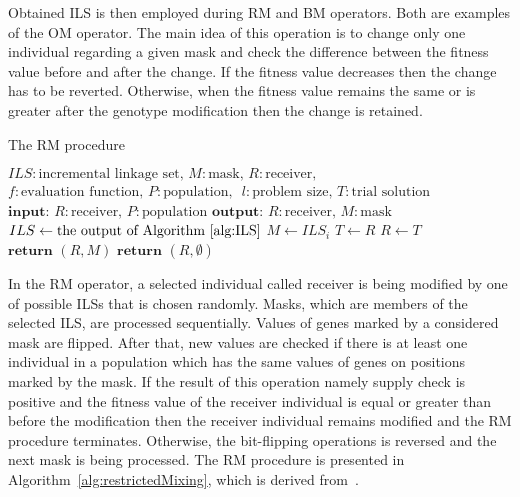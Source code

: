 Obtained ILS is then employed during RM and BM operators. Both are examples of the OM operator. The main idea of this operation is to change only one individual regarding a given mask and check the difference between the fitness value before and after the change. If the fitness value decreases then the change has to be reverted. Otherwise, when the fitness value remains the same or is greater after the genotype modification then the change is retained.
\begin{algorithm}
	\caption{The RM procedure}
	\label{alg:restrictedMixing}
	\begin{algorithmic}[1]
		\State $ILS: \text{incremental linkage set, } M: \text{mask, } R: \text{receiver,}$
		\State $f: \text{evaluation function, } P: \text{population, }$
		\State $l: \text{problem size, } T: \text{trial solution}$
		\State {}
		\State {}
		\State $\textbf{input: } R: \text{receiver, } P: \text{population}$
		\State $\textbf{output: } R: \text{receiver, } M: \text{mask}$
		\State $ILS \gets \text{the output of Algorithm~\ref{alg:ILS}}$
			\State $M \gets ILS_i$
				\State $T \gets R$
				\State {}
					\State $R \gets T$
					\State $\textbf{return } (R, M)$
				\EndIf
			\EndIf
		\EndFor
		\State $\textbf{return } (R, \emptyset)$
	\end{algorithmic}
\end{algorithm}
In the RM operator, a selected individual called receiver is being modified by one of possible ILSs that is chosen randomly. Masks, which are members of the selected ILS, are processed sequentially. Values of genes marked by a considered mask are flipped. After that, new values are checked if there is at least one individual in a population which has the same values of genes on positions marked by the mask. If the result of this operation namely supply check is positive and the fitness value of the receiver individual is equal or greater than before the modification then the receiver individual remains modified and the RM procedure terminates. Otherwise, the bit-flipping operations is reversed and the next mask is being processed. The RM procedure is presented in Algorithm~\ref{alg:restrictedMixing}, which is derived from~\cite{dsmga2e}.
